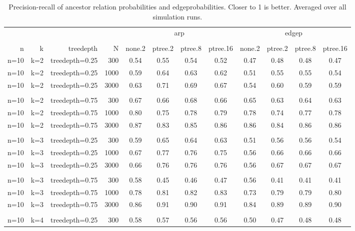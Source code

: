 \begin{table}[ht]
\centering
\caption{Precision-recall of ancestor relation probabilities and edgeprobabilities. Closer to 1 is better. Averaged over all simulation runs.} 
\begin{tabular}{rrrr|cccc|cccc}
  \toprule
   & & & &\multicolumn{4}{c}{arp}&\multicolumn{4}{c}{edgep}   \\ 
 \cline{5-12}  \\ 
 n & k & treedepth & N & none.2 & ptree.2 & ptree.8 & ptree.16 & none.2 & ptree.2 & ptree.8 & ptree.16  \\ 
 \midrule
n=10 & k=2 & treedepth=0.25 & 300 & 0.54 & 0.55 & 0.54 & 0.52 & 0.47 & 0.48 & 0.48 & 0.47 \\ 
  n=10 & k=2 & treedepth=0.25 & 1000 & 0.59 & 0.64 & 0.63 & 0.62 & 0.51 & 0.55 & 0.55 & 0.54 \\ 
  n=10 & k=2 & treedepth=0.25 & 3000 & 0.63 & 0.71 & 0.69 & 0.67 & 0.54 & 0.60 & 0.59 & 0.59 \\ 
   \\ 
n=10 & k=2 & treedepth=0.75 & 300 & 0.67 & 0.66 & 0.68 & 0.66 & 0.65 & 0.63 & 0.64 & 0.63 \\ 
  n=10 & k=2 & treedepth=0.75 & 1000 & 0.80 & 0.75 & 0.78 & 0.79 & 0.78 & 0.74 & 0.77 & 0.78 \\ 
  n=10 & k=2 & treedepth=0.75 & 3000 & 0.87 & 0.83 & 0.85 & 0.86 & 0.86 & 0.84 & 0.86 & 0.86 \\ 
   \\ 
n=10 & k=3 & treedepth=0.25 & 300 & 0.59 & 0.65 & 0.64 & 0.63 & 0.51 & 0.56 & 0.56 & 0.54 \\ 
  n=10 & k=3 & treedepth=0.25 & 1000 & 0.67 & 0.77 & 0.76 & 0.75 & 0.56 & 0.66 & 0.66 & 0.66 \\ 
  n=10 & k=3 & treedepth=0.25 & 3000 & 0.66 & 0.76 & 0.76 & 0.76 & 0.56 & 0.67 & 0.67 & 0.67 \\ 
   \\ 
n=10 & k=3 & treedepth=0.75 & 300 & 0.58 & 0.45 & 0.46 & 0.47 & 0.56 & 0.41 & 0.41 & 0.41 \\ 
  n=10 & k=3 & treedepth=0.75 & 1000 & 0.78 & 0.81 & 0.82 & 0.83 & 0.73 & 0.79 & 0.79 & 0.80 \\ 
  n=10 & k=3 & treedepth=0.75 & 3000 & 0.86 & 0.91 & 0.90 & 0.91 & 0.84 & 0.89 & 0.89 & 0.90 \\ 
   \\ 
n=10 & k=4 & treedepth=0.25 & 300 & 0.58 & 0.57 & 0.56 & 0.56 & 0.50 & 0.47 & 0.48 & 0.48 \\ 

\end{tabular}
\end{table}
